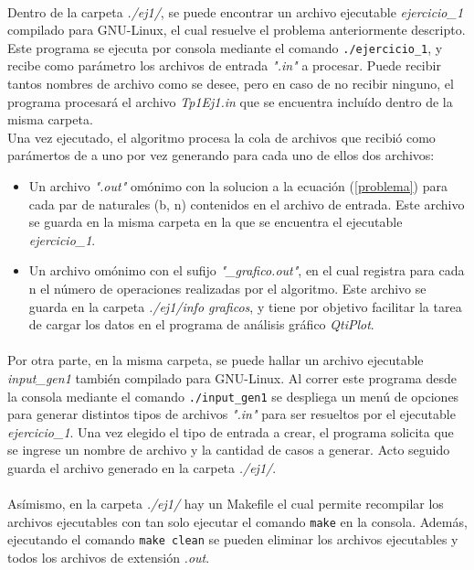 \paragraph{}
Dentro de la carpeta \textit{./ej1/}, se puede encontrar un archivo ejecutable \textit{ejercicio\_1} compilado para GNU-Linux, el cual resuelve el problema anteriormente descripto. Este programa se ejecuta por consola mediante el comando \texttt{./ejercicio\_1}, y recibe como parámetro los archivos de entrada \textit{".in"} a procesar. Puede recibir tantos nombres de archivo como se desee, pero en caso de no recibir ninguno, el programa procesará el archivo \textit{Tp1Ej1.in} que se encuentra incluído dentro de la misma carpeta. \\
Una vez ejecutado, el algoritmo procesa la cola de archivos que recibió como parámertos de a uno por vez generando para cada uno de ellos dos archivos:
	\begin{itemize}
		\item{Un archivo \textit{".out"} omónimo con la solucion a la ecuación (\ref{problema}) para cada par de naturales (b, n) contenidos en el archivo de entrada. Este archivo se guarda en la misma carpeta en la que se encuentra el ejecutable \textit{ejercicio\_1}}.
		\item{Un archivo omónimo con el sufijo \textit{"\_grafico.out"}, en el cual registra para cada n el número de operaciones realizadas por el algoritmo. Este archivo se guarda en la carpeta \textit{./ej1/info graficos}, y tiene por objetivo facilitar la tarea de cargar los datos en el programa de análisis gráfico \textit{QtiPlot}}.
	\end{itemize}

\paragraph{}		
Por otra parte, en la misma carpeta, se puede hallar un archivo ejecutable \textit{input\_gen1} también compilado para GNU-Linux. Al correr este programa desde la consola mediante el comando \texttt{./input\_gen1} se despliega un menú de opciones para generar distintos tipos de archivos \textit{".in"} para ser resueltos por el ejecutable \textit{ejercicio\_1}. Una vez elegido el tipo de entrada a crear, el programa solicita que se ingrese un nombre de archivo y la cantidad de casos a generar. Acto seguido guarda el archivo generado en la carpeta \textit{./ej1/}.

\paragraph{}
Asímismo, en la carpeta \textit{./ej1/} hay un Makefile el cual permite recompilar los archivos ejecutables con tan solo ejecutar el comando \texttt{make} en la consola. Además, ejecutando el comando \texttt{make clean} se pueden eliminar los archivos ejecutables y todos los archivos de extensión \textit{.out}.

